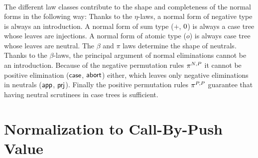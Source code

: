 \documentclass[a4paper,USenglish,cleveref, autoref]{lipics-v2019}
\begin{document}
\begin{gather*}
\end{gather*}
The different law classes contribute to the shape and completeness of
the normal forms in the following way:
Thanks to the $\eta$-laws, a normal form of negative type is always an
introduction.  A normal form of sum type ($+$, $0$) is always a
case tree whose leaves are injections.  A normal form of atomic type
($o$) is always case tree whose leaves are neutral.
The $\beta$ and $\pi$ laws determine the shape of neutrals.
Thanks to the $\beta$-laws,
the principal argument of normal eliminations cannot be an
introduction.  Because of the negative permutation rules
$\pi^{N,P}$ it cannot be positive elimination
($\mathsf{case}$, $\mathsf{abort}$) either, which leaves only negative eliminations
in neutrals ($\mathsf{app}$, $\mathsf{prj}$).  Finally the positive permutation
rules $\pi^{P,P}$ guarantee that having neutral scrutinees in case
trees is sufficient.


\clearpage

\section{Normalization to Call-By-Push Value}
\label{sec:cbpv}
\end{document}
